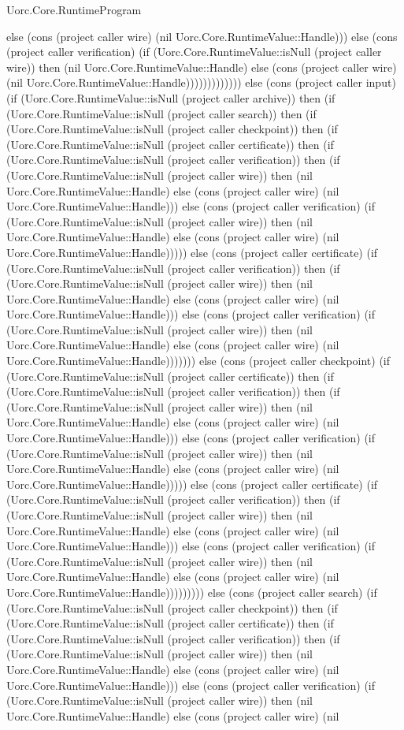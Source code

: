 \begin{lexlean}{Uorc.Core.RuntimeProgram}
\begin{semanticmodule}
{else (cons (project caller wire) (nil Uorc.Core.RuntimeValue::Handle))) else (cons (project caller verification) (if (Uorc.Core.RuntimeValue::isNull (project caller wire)) then (nil Uorc.Core.RuntimeValue::Handle) else (cons (project caller wire) (nil Uorc.Core.RuntimeValue::Handle))))))))))))) else (cons (project caller input) (if (Uorc.Core.RuntimeValue::isNull (project caller archive)) then (if (Uorc.Core.RuntimeValue::isNull (project caller search)) then (if (Uorc.Core.RuntimeValue::isNull (project caller checkpoint)) then (if (Uorc.Core.RuntimeValue::isNull (project caller certificate)) then (if (Uorc.Core.RuntimeValue::isNull (project caller verification)) then (if (Uorc.Core.RuntimeValue::isNull (project caller wire)) then (nil Uorc.Core.RuntimeValue::Handle) else (cons (project caller wire) (nil Uorc.Core.RuntimeValue::Handle))) else (cons (project caller verification) (if (Uorc.Core.RuntimeValue::isNull (project caller wire)) then (nil Uorc.Core.RuntimeValue::Handle) else (cons (project caller wire) (nil Uorc.Core.RuntimeValue::Handle))))) else (cons (project caller certificate) (if (Uorc.Core.RuntimeValue::isNull (project caller verification)) then (if (Uorc.Core.RuntimeValue::isNull (project caller wire)) then (nil Uorc.Core.RuntimeValue::Handle) else (cons (project caller wire) (nil Uorc.Core.RuntimeValue::Handle))) else (cons (project caller verification) (if (Uorc.Core.RuntimeValue::isNull (project caller wire)) then (nil Uorc.Core.RuntimeValue::Handle) else (cons (project caller wire) (nil Uorc.Core.RuntimeValue::Handle))))))) else (cons (project caller checkpoint) (if (Uorc.Core.RuntimeValue::isNull (project caller certificate)) then (if (Uorc.Core.RuntimeValue::isNull (project caller verification)) then (if (Uorc.Core.RuntimeValue::isNull (project caller wire)) then (nil Uorc.Core.RuntimeValue::Handle) else (cons (project caller wire) (nil Uorc.Core.RuntimeValue::Handle))) else (cons (project caller verification) (if (Uorc.Core.RuntimeValue::isNull (project caller wire)) then (nil Uorc.Core.RuntimeValue::Handle) else (cons (project caller wire) (nil Uorc.Core.RuntimeValue::Handle))))) else (cons (project caller certificate) (if (Uorc.Core.RuntimeValue::isNull (project caller verification)) then (if (Uorc.Core.RuntimeValue::isNull (project caller wire)) then (nil Uorc.Core.RuntimeValue::Handle) else (cons (project caller wire) (nil Uorc.Core.RuntimeValue::Handle))) else (cons (project caller verification) (if (Uorc.Core.RuntimeValue::isNull (project caller wire)) then (nil Uorc.Core.RuntimeValue::Handle) else (cons (project caller wire) (nil Uorc.Core.RuntimeValue::Handle))))))))) else (cons (project caller search) (if (Uorc.Core.RuntimeValue::isNull (project caller checkpoint)) then (if (Uorc.Core.RuntimeValue::isNull (project caller certificate)) then (if (Uorc.Core.RuntimeValue::isNull (project caller verification)) then (if (Uorc.Core.RuntimeValue::isNull (project caller wire)) then (nil Uorc.Core.RuntimeValue::Handle) else (cons (project caller wire) (nil Uorc.Core.RuntimeValue::Handle))) else (cons (project caller verification) (if (Uorc.Core.RuntimeValue::isNull (project caller wire)) then (nil Uorc.Core.RuntimeValue::Handle) else (cons (project caller wire) (nil }
\end{semanticmodule}
\end{lexlean}
